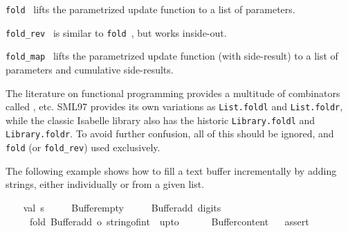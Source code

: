 \begin{isabellebody}
\begin{isamarkuptext}
  \begin{description}

  \item \verb|fold|~ lifts the parametrized update function
   to a list of parameters.

  \item \verb|fold_rev|~ is similar to \verb|fold|~, but works inside-out.

  \item \verb|fold_map|~ lifts the parametrized update
  function  (with side-result) to a list of parameters and
  cumulative side-results.

  \end{description}

  \begin{warn}
  The literature on functional programming provides a multitude of
  combinators called ,  etc.  SML97
  provides its own variations as \verb|List.foldl| and \verb|List.foldr|, while the classic Isabelle library also has the
  historic \verb|Library.foldl| and \verb|Library.foldr|.  To avoid
  further confusion, all of this should be ignored, and \verb|fold| (or
  \verb|fold_rev|) used exclusively.
  \end{warn}%
\end{isamarkuptext}%
\isamarkuptrue%
%
\endisatagmlref
{\isafoldmlref}%
%
\isadelimmlref
%
\endisadelimmlref
%
\isadelimmlex
%
\endisadelimmlex
%
\isatagmlex
%
\begin{isamarkuptext}%
The following example shows how to fill a text buffer
  incrementally by adding strings, either individually or from a given
  list.%
\end{isamarkuptext}%
\isamarkuptrue%
%
\endisatagmlex
{\isafoldmlex}%
%
\isadelimmlex
%
\endisadelimmlex
%
\isadelimML
%
\endisadelimML
%
\isatagML
{}\isamarkupfalse%
\ {\isacharverbatimopen}\isanewline
\ \ val\ s\ {\isacharequal}\isanewline
\ \ \ \ Buffer{\isachardot}empty\isanewline
\ \ \ \ {\isacharbar}{\isachargreater}\ Buffer{\isachardot}add\ {\isachardoublequote}digits{\isacharcolon}\ {\isachardoublequote}\isanewline
\ \ \ \ {\isacharbar}{\isachargreater}\ fold\ {\isacharparenleft}Buffer{\isachardot}add\ o\ string{\isacharunderscore}of{\isacharunderscore}int{\isacharparenright}\ {\isacharparenleft}{}\ upto\ {}{\isacharparenright}\isanewline
\ \ \ \ {\isacharbar}{\isachargreater}\ Buffer{\isachardot}content{\isacharsemicolon}\isanewline
\isanewline
\ \ %
\isaantiq
assert%
\endisaantiq

\end{isabellebody}
